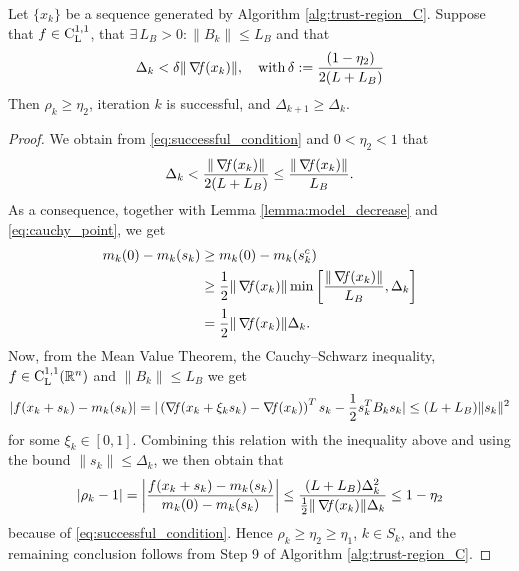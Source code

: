 \documentclass[10pt,a4paper]{article}
\begin{document}
\begin{lemma}\label{lemma:successful_condition}
	Let $\{x_k\}$ be a sequence generated by Algorithm \ref{alg:trust-region_C}. Suppose that $f\in \mathord{\mathrm{C^{1,1}_{L}}}$, that $\exists \, L_B>0: \|B_k\| \leq L_B$ and that
	\begin{equation}\label{eq:successful_condition}
		\Delta_k < \delta\|\operatorname*{\mathit{\nabla \!f}}(x_k)\|, \quad \mathord{\mathrm{with }}\, \delta:=\frac{(1 - \eta_2)}{2(L + L_B)}
	\end{equation}
	Then $\rho_k \geq \eta_2$, iteration $k$ is successful, and $\Delta_{k+1} \geq \Delta_k$.
\end{lemma}

\begin{proof}
	We obtain from \eqref{eq:successful_condition} and $0 < \eta_2 < 1$ that
	\begin{equation*}
		\Delta_k < \frac{\|\operatorname*{\mathit{\nabla \!f}}(x_k)\|}{2(L + L_B)} \leq \frac{\|\operatorname*{\mathit{\nabla \!f}}(x_k)\|}{L_B}.
	\end{equation*}
	As a consequence, together with Lemma \ref{lemma:model_decrease} and \eqref{eq:cauchy_point}, we get
	\begin{align*}
		m_k(0) - m_k(s_k) &\geq m_k(0) - m_k(s_k^c) \\
		&\geq \frac{1}{2} \|\operatorname*{\mathit{\nabla \!f}}(x_k)\| \min \left[ \frac{\|\operatorname*{\mathit{\nabla \!f}}(x_k)\|}{L_B}, \Delta_k \right] \\
		&= \frac{1}{2} \|\operatorname*{\mathit{\nabla \!f}}(x_k)\| \Delta_k.
	\end{align*}
	Now, from the Mean Value Theorem, the Cauchy--Schwarz inequality, $f\in \mathord{\mathrm{C^{1,1}_{L}}}(\mathbb{R}^n)$ and $\|B_k\| \leq L_B$ we get
	\begin{equation*}
		|f(x_k + s_k) - m_k(s_k)| = |\left(\operatorname*{\mathit{\nabla \!f}}(x_k+\xi_k s_k) - \operatorname*{\mathit{\nabla \!f}}(x_k) \right)^Ts_k  - \frac{1}{2}  s_k^TB_k s_k | \leq (L + L_B) \|s_k\|^2
	\end{equation*}
	for some $\xi_k \in [0, 1]$. Combining this relation with the inequality above and using the bound $\|s_k\| \leq \Delta_k$, we then obtain that
	\begin{equation*}
		|\rho_k - 1| = \left| \frac{f(x_k + s_k) - m_k(s_k)}{m_k(0) - m_k(s_k)} \right| \leq \frac{(L + L_B) \Delta_k^2}{\frac{1}{2} \|\operatorname*{\mathit{\nabla \!f}}(x_k)\| \Delta_k} \leq 1 - \eta_2
	\end{equation*}
	because of \eqref{eq:successful_condition}. Hence $\rho_k \geq \eta_2 \geq \eta_1$, $k \in S_k$, and the remaining conclusion follows from Step 9 of Algorithm \ref{alg:trust-region_C}. 
\end{proof} 
\end{document}
